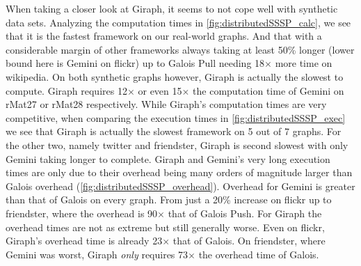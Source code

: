 When taking a closer look at Giraph, it seems to not cope well with synthetic data sets. Analyzing the computation times in \autoref{fig:distributedSSSP_calc}, we see that it is the fastest framework on our real-world graphs. And that with a considerable margin of other frameworks always taking at least 50\% longer (lower bound here is Gemini on flickr) up to Galois Pull needing 18$\times$ more time on wikipedia.
On both synthetic graphs however, Giraph is actually the slowest to compute. Giraph requires 12$\times$ or even 15$\times$ the computation time of Gemini on rMat27 or rMat28 respectively.
While Giraph's computation times are very competitive, when comparing the execution times in \autoref{fig:distributedSSSP_exec} we see that Giraph is actually the slowest framework on 5 out of 7 graphs. For the other two, namely twitter and friendster, Giraph is second slowest with only Gemini taking longer to complete.
Giraph and Gemini's very long execution times are only due to their overhead being many orders of magnitude larger than Galois overhead (\autoref{fig:distributedSSSP_overhead}).
Overhead for Gemini is greater than that of Galois on every graph. From just a 20\% increase on flickr up to friendster, where the overhead is 90$\times$ that of Galois Push.
For Giraph the overhead times are not as extreme but still generally worse. Even on flickr, Giraph's overhead time is already 23$\times$ that of Galois. On friendster, where Gemini was worst, Giraph \emph{only} requires 73$\times$ the overhead time of Galois.

